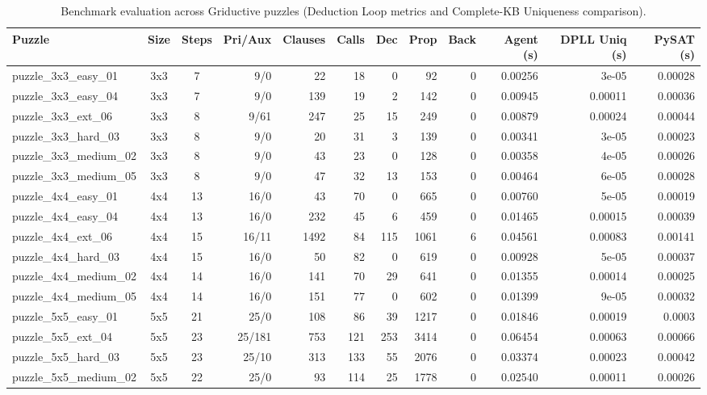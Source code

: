 \begin{table}[h!]
\centering
\scriptsize
\begin{tabular}{|l|c|c|r|r|r|r|r|r|r|r|r|}
\hline
\textbf{Puzzle} & \textbf{Size} & \textbf{Steps} & \textbf{Pri/Aux} & \textbf{Clauses} & \textbf{Calls} & \textbf{Dec} & \textbf{Prop} & \textbf{Back} & \textbf{Agent (s)} & \textbf{DPLL Uniq (s)} & \textbf{PySAT (s)} \\ \hline
puzzle\_3x3\_easy\_01 & 3x3 & 7 & 9/0 & 22 & 18 & 0 & 92 & 0 & 0.00256 & 3e-05 & 0.00028 \\ \hline
puzzle\_3x3\_easy\_04 & 3x3 & 7 & 9/0 & 139 & 19 & 2 & 142 & 0 & 0.00945 & 0.00011 & 0.00036 \\ \hline
puzzle\_3x3\_ext\_06 & 3x3 & 8 & 9/61 & 247 & 25 & 15 & 249 & 0 & 0.00879 & 0.00024 & 0.00044 \\ \hline
puzzle\_3x3\_hard\_03 & 3x3 & 8 & 9/0 & 20 & 31 & 3 & 139 & 0 & 0.00341 & 3e-05 & 0.00023 \\ \hline
puzzle\_3x3\_medium\_02 & 3x3 & 8 & 9/0 & 43 & 23 & 0 & 128 & 0 & 0.00358 & 4e-05 & 0.00026 \\ \hline
puzzle\_3x3\_medium\_05 & 3x3 & 8 & 9/0 & 47 & 32 & 13 & 153 & 0 & 0.00464 & 6e-05 & 0.00028 \\ \hline
puzzle\_4x4\_easy\_01 & 4x4 & 13 & 16/0 & 43 & 70 & 0 & 665 & 0 & 0.00760 & 5e-05 & 0.00019 \\ \hline
puzzle\_4x4\_easy\_04 & 4x4 & 13 & 16/0 & 232 & 45 & 6 & 459 & 0 & 0.01465 & 0.00015 & 0.00039 \\ \hline
puzzle\_4x4\_ext\_06 & 4x4 & 15 & 16/11 & 1492 & 84 & 115 & 1061 & 6 & 0.04561 & 0.00083 & 0.00141 \\ \hline
puzzle\_4x4\_hard\_03 & 4x4 & 15 & 16/0 & 50 & 82 & 0 & 619 & 0 & 0.00928 & 5e-05 & 0.00037 \\ \hline
puzzle\_4x4\_medium\_02 & 4x4 & 14 & 16/0 & 141 & 70 & 29 & 641 & 0 & 0.01355 & 0.00014 & 0.00025 \\ \hline
puzzle\_4x4\_medium\_05 & 4x4 & 14 & 16/0 & 151 & 77 & 0 & 602 & 0 & 0.01399 & 9e-05 & 0.00032 \\ \hline
puzzle\_5x5\_easy\_01 & 5x5 & 21 & 25/0 & 108 & 86 & 39 & 1217 & 0 & 0.01846 & 0.00019 & 0.0003 \\ \hline
puzzle\_5x5\_ext\_04 & 5x5 & 23 & 25/181 & 753 & 121 & 253 & 3414 & 0 & 0.06454 & 0.00063 & 0.00066 \\ \hline
puzzle\_5x5\_hard\_03 & 5x5 & 23 & 25/10 & 313 & 133 & 55 & 2076 & 0 & 0.03374 & 0.00023 & 0.00042 \\ \hline
puzzle\_5x5\_medium\_02 & 5x5 & 22 & 25/0 & 93 & 114 & 25 & 1778 & 0 & 0.02540 & 0.00011 & 0.00026 \\ \hline
\end{tabular}
\caption{Benchmark evaluation across Griductive puzzles (Deduction Loop metrics and Complete-KB Uniqueness comparison).}
\label{tab:experiments}
\end{table}
